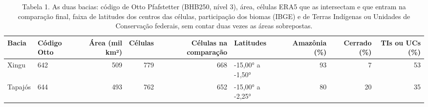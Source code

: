 \begin{table}
\caption{Tabela 1. As duas bacias: código de Otto Pfafstetter (BHB250, nível 3), área, células ERA5 que as intersectam e que entram na comparação final, faixa de latitudes dos centros das células, participação dos biomas (IBGE) e de Terras Indígenas ou Unidades de Conservação federais, sem contar duas vezes as áreas sobrepostas.}
\label{tab:02_regioes::comparacao}
\begin{tabular}{llrrrlrrr}
\toprule
Bacia & Código Otto & Área (mil km²) & Células & Células na comparação & Latitudes & Amazônia (\%) & Cerrado (\%) & TIs ou UCs (\%) \\
\midrule
Xingu & 642 & 509 & 779 & 668 & -15,00° a -1,50° & 93 & 7 & 53 \\
Tapajós & 644 & 493 & 762 & 652 & -15,00° a -2,25° & 80 & 20 & 35 \\
\bottomrule
\end{tabular}
\end{table}
